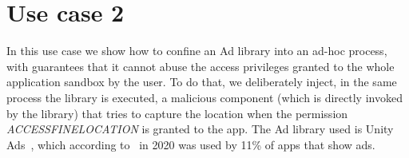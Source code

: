 \section{Use case 2}\label{appendix:seapp_uc2}

In this use case we show how to confine an Ad library into an ad-hoc
process, with guarantees that it cannot abuse the access privileges
granted to the whole application sandbox by the user.  To do that, we
deliberately inject, in the same process the library is executed, a
malicious component (which is directly invoked by the library) that
tries to capture the location when the permission {\em
  ACCESS\textunderscore FINE\textunderscore LOCATION} is granted to
the app. The Ad library used is Unity Ads~\cite{seapp_unityads}, which
according to~\cite{seapp_ads_use} in 2020 was used by 11\% of apps
that show ads.
%
